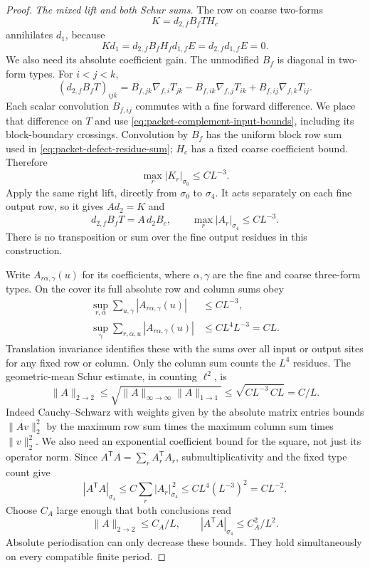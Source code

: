\documentclass[11pt,reqno]{amsart}
\numberwithin{equation}{section}
\theoremstyle{definition}
\theoremstyle{remark}
\begin{document}
\begin{proof}
\smallskip\noindent
\emph{The mixed lift and both Schur sums.}
The row on coarse two-forms
\[
                         K=d_{2,f}B_fTH_c
\]
annihilates \(d_1\), because
\[
                Kd_1=d_{2,f}B_fH_fd_{1,f}E
                         =d_{2,f}d_{1,f}E=0.
\]
We also need its absolute coefficient gain. The unmodified
\(B_f\) is diagonal in two-form types. For \(i<j<k\),
\[
 (d_{2,f}B_fT)_{ijk}
 =B_{f,jk}\nabla_{f,i}T_{jk}
  -B_{f,ik}\nabla_{f,j}T_{ik}
  +B_{f,ij}\nabla_{f,k}T_{ij}.
\]
Each scalar convolution \(B_{f,ij}\) commutes with a fine
forward difference. We place that difference on \(T\) and
use \eqref{eq:packet-complement-input-bounds}, including its
block-boundary crossings. Convolution by \(B_f\) has the
uniform block row sum used in
\eqref{eq:packet-defect-residue-sum}; \(H_c\) has a fixed
coarse coefficient bound. Therefore
\[
                         \max_r|K_r|_{\sigma_0}\le CL^{-3}.
\]
Apply the same right lift, directly from \(\sigma_0\) to
\(\sigma_4\). It acts separately on each fine output row,
so it gives \(A d_2=K\) and
\begin{equation}
 d_{2,f}B_fT=A\,d_2B_c,\qquad
                         \max_r|A_r|_{\sigma_4}\le CL^{-3}.
 \label{eq:packet-mixed-lift-price}
\end{equation}
There is no transposition or sum over the fine output
residues in this construction.

Write \(A_{r\alpha,\gamma}(u)\) for its coefficients, where
\(\alpha,\gamma\) are the fine and coarse three-form types.
On the cover its full absolute row and column sums obey
\begin{equation}
 \begin{aligned}
 \sup_{r,\alpha}\sum_{u,\gamma}
                         |A_{r\alpha,\gamma}(u)|
       &\le CL^{-3},\\
 \sup_\gamma\sum_{r,\alpha,u}
                         |A_{r\alpha,\gamma}(u)|
       &\le CL^4L^{-3}=CL.
 \end{aligned}
 \label{eq:packet-mixed-schur-sums}
\end{equation}
Translation invariance identifies these with the sums over
all input or output sites for any fixed row or column.
Only the column sum counts the \(L^4\) residues. The
geometric-mean Schur estimate, in counting \(\ell^2\), is
\[
 \|A\|_{2\to2}
 \le\sqrt{\|A\|_{\infty\to\infty}\|A\|_{1\to1}}
 \le\sqrt{CL^{-3}\,CL}=C/L.
\]
Indeed Cauchy--Schwarz with weights given by the absolute
matrix entries bounds \(\|Av\|_2^2\) by the maximum row
sum times the maximum column sum times \(\|v\|_2^2\).
We also need an exponential coefficient bound for the square,
not just its operator norm. Since
\(A^{\mathsf T}A=\sum_r A_r^{\mathsf T}A_r\), submultiplicativity and the
fixed type count give
\[
 |A^{\mathsf T}A|_{\sigma_4}
 \le C\sum_r|A_r|_{\sigma_4}^{\,2}
 \le CL^4(L^{-3})^2=CL^{-2}.
\]
Choose \(C_A\) large enough that both conclusions read
\begin{equation}
          \|A\|_{2\to2}\le C_A/L,\qquad
                    |A^{\mathsf T}A|_{\sigma_4}\le C_A^2/L^2.
 \label{eq:packet-mixed-square-price}
\end{equation}
Absolute periodisation can only decrease these bounds.
They hold simultaneously on every compatible finite period.


\end{proof}
\end{document}
